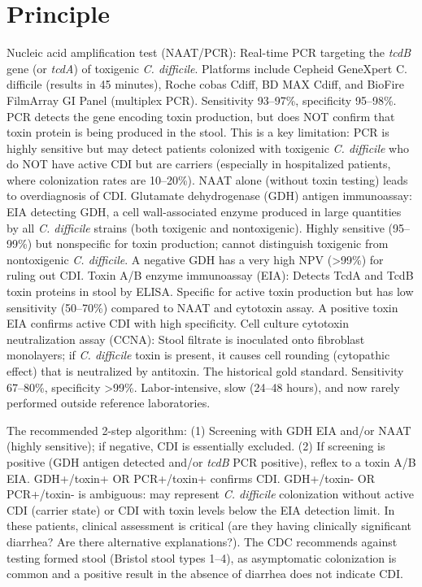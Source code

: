 \section*{Principle}
Nucleic acid amplification test (NAAT/PCR): Real-time PCR targeting the \textit{tcdB} gene (or \textit{tcdA}) of toxigenic \textit{C. difficile}. Platforms include Cepheid GeneXpert C. difficile (results in 45 minutes), Roche cobas Cdiff, BD MAX Cdiff, and BioFire FilmArray GI Panel (multiplex PCR). Sensitivity 93--97\%, specificity 95--98\%. PCR detects the gene encoding toxin production, but does NOT confirm that toxin protein is being produced in the stool. This is a key limitation: PCR is highly sensitive but may detect patients colonized with toxigenic \textit{C. difficile} who do NOT have active CDI but are carriers (especially in hospitalized patients, where colonization rates are 10--20\%). NAAT alone (without toxin testing) leads to overdiagnosis of CDI. Glutamate dehydrogenase (GDH) antigen immunoassay: EIA detecting GDH, a cell wall-associated enzyme produced in large quantities by all \textit{C. difficile} strains (both toxigenic and nontoxigenic). Highly sensitive (95--99\%) but nonspecific for toxin production; cannot distinguish toxigenic from nontoxigenic \textit{C. difficile}. A negative GDH has a very high NPV (>99\%) for ruling out CDI. Toxin A/B enzyme immunoassay (EIA): Detects TcdA and TcdB toxin proteins in stool by ELISA. Specific for active toxin production but has low sensitivity (50--70\%) compared to NAAT and cytotoxin assay. A positive toxin EIA confirms active CDI with high specificity. Cell culture cytotoxin neutralization assay (CCNA): Stool filtrate is inoculated onto fibroblast monolayers; if \textit{C. difficile} toxin is present, it causes cell rounding (cytopathic effect) that is neutralized by antitoxin. The historical gold standard. Sensitivity 67--80\%, specificity >99\%. Labor-intensive, slow (24--48 hours), and now rarely performed outside reference laboratories.

The recommended 2-step algorithm: (1) Screening with GDH EIA and/or NAAT (highly sensitive); if negative, CDI is essentially excluded. (2) If screening is positive (GDH antigen detected and/or \textit{tcdB} PCR positive), reflex to a toxin A/B EIA. GDH+/toxin+ OR PCR+/toxin+ confirms CDI. GDH+/toxin- OR PCR+/toxin- is ambiguous: may represent \textit{C. difficile} colonization without active CDI (carrier state) or CDI with toxin levels below the EIA detection limit. In these patients, clinical assessment is critical (are they having clinically significant diarrhea? Are there alternative explanations?). The CDC recommends against testing formed stool (Bristol stool types 1--4), as asymptomatic colonization is common and a positive result in the absence of diarrhea does not indicate CDI.

